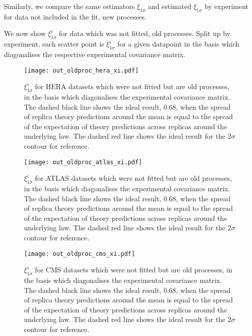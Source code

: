 Similarly, we compare the same estimators $\xi_{1\sigma}$ and estimated
$\xi_{1\sigma}$ by experiment for data not included in the fit, new processes.



We now show $\xi_{1\sigma}^{i}$ for data which was not fitted, old processes. Split
up by experiment, each scatter point is $\xi_{1\sigma}^{i}$ for a given datapoint
in the basis which diagonalises the respective experimental covariance matrix.

\begin{figure}[!b]
    \centering
    \texttt{[image: out\_oldproc\_hera\_xi.pdf]}
    \caption{$\xi_{1\sigma}^{i}$ for HERA datasets which were not fitted
    but are old processes, in the basis which diagonalises the experimental
    covariance matrix. The dashed black line shows the ideal result, 0.68, when
    the spread of replica theory predictions around the mean is equal to the
    spread of the expectation of theory predictions across replicas around the
    underlying law. The dashed red line shows the ideal result for the $2\sigma$
    contour for reference.}
    \label{fig:outoldheraxi}
\end{figure}

\begin{figure}[ht]
    \centering
    \texttt{[image: out\_oldproc\_atlas\_xi.pdf]}
    \caption{$\xi_{1\sigma}^{i}$ for ATLAS datasets which were not fitted
    but are old processes, in the basis which diagonalises the experimental
    covariance matrix. The dashed black line shows the ideal result, 0.68, when
    the spread of replica theory predictions around the mean is equal to the
    spread of the expectation of theory predictions across replicas around the
    underlying law. The dashed red line shows the ideal result for the $2\sigma$
    contour for reference.}
    \label{fig:outoldatlasxi}
\end{figure}

\begin{figure}[ht]
    \centering
    \texttt{[image: out\_oldproc\_cms\_xi.pdf]}
    \caption{$\xi_{1\sigma}^{i}$ for CMS datasets which were not fitted
    but are old processes, in the basis which diagonalises the experimental
    covariance matrix. The dashed black line shows the ideal result, 0.68, when
    the spread of replica theory predictions around the mean is equal to the
    spread of the expectation of theory predictions across replicas around the
    underlying law. The dashed red line shows the ideal result for the $2\sigma$
    contour for reference.}
    \label{fig:outoldcmsxi}
\end{figure}

